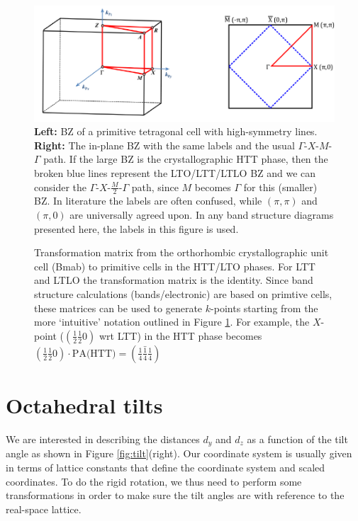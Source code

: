 \begin{figure}
    \centering
    \includegraphics{fig/simulation/band_paths.pdf}
    \caption[Band paths]{\textbf{Left:} BZ of a primitive tetragonal cell with high-symmetry lines. \textbf{Right:} The in-plane BZ with the same labels and the usual $\Gamma$-$X$-$M$-$\Gamma$ path. If the large BZ is the crystallographic HTT phase, then the broken blue lines represent the LTO/LTT/LTLO BZ and we can consider the $\Gamma$-$X$-$\frac{M}{2}$-$\Gamma$ path, since $M$ becomes $\Gamma$ for this (smaller) BZ. In literature the labels are often confused, while $(\pi,\pi)$ and $(\pi,0)$ are universally agreed upon. In any band structure diagrams presented here, the labels in this figure is used.} 
    \label{fig:band_paths}
\end{figure}

\begin{figure}
    \centering
    
    \caption[Transformation matrices]{Transformation matrix from the orthorhombic crystallographic unit cell (Bmab) to primitive cells in the HTT/LTO phases. For LTT and LTLO the transformation matrix is the identity. Since band structure calculations (bands/electronic) are based on primtive cells, these matrices can be used to generate $k$-points starting from the more `intuitive' notation outlined in Figure \ref{fig:band_paths}. For example, the $X$-point ($(\frac{1}{2} \frac{1}{2} 0)$ wrt LTT) in the HTT phase becomes $(\frac{1}{2} \frac{1}{2} 0) \cdot \text{PA(HTT)} = (\frac{1}{4} \bar{\frac{1}{4}} \frac{1}{4})$}
    \label{fig:primtive_axes}
\end{figure}

\section{Octahedral tilts}
We are interested in describing the distances $d_y$ and $d_z$ as a function of the tilt angle as shown in Figure \ref{fig:tilt}(right). Our coordinate system is usually given in terms of lattice constants that define the coordinate system and scaled coordinates. To do the rigid rotation, we thus need to perform some transformations in order to make sure the tilt angles are with reference to the real-space lattice.

